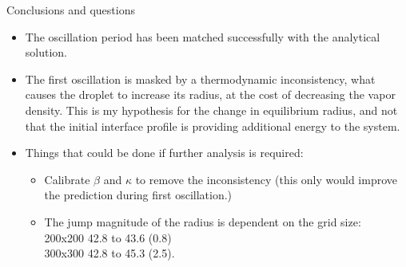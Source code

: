 \documentclass[8pt]{beamer}
\begin{document}
	\begin{frame}{Conclusions and questions}
		
		\begin{itemize}
			\item<1> The oscillation period has been matched successfully with the analytical solution.
			\item<1> The first oscillation is masked by a thermodynamic inconsistency, what causes the droplet to increase its radius, at the cost of decreasing the vapor density. This is my hypothesis for the change in equilibrium radius, and not that the initial interface profile is providing additional energy to the system.
			\item<2-> Things that could be done if further analysis is required:
			\begin{itemize}
				\item Calibrate $\beta$ and $\kappa$ to remove the inconsistency (this only would improve the prediction during first oscillation.)
				\item The jump magnitude of the radius is dependent on the grid size:\\
				 200x200 42.8 to 43.6 (0.8)\\
				 300x300 42.8 to 45.3 (2.5).
			\end{itemize}
		\end{itemize}
	\end{frame}
	
\end{document}
